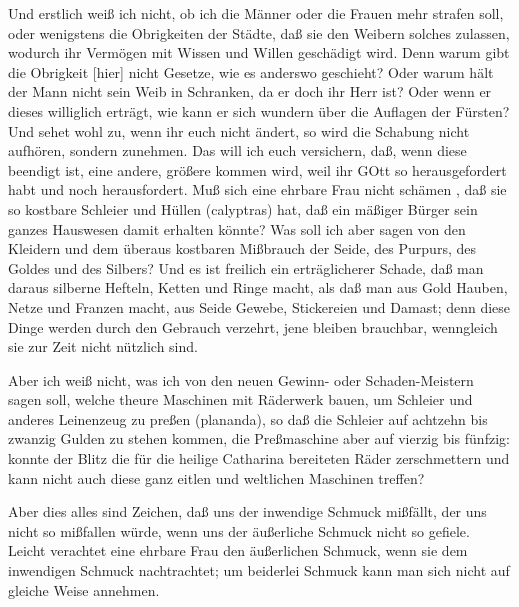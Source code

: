 Und erstlich weiß ich nicht, ob ich die Männer oder die Frauen mehr strafen soll, oder wenigstens die Obrigkeiten der Städte, daß sie den Weibern solches zulassen, wodurch ihr Vermögen mit Wissen und Willen geschädigt wird. Denn warum gibt die Obrigkeit [hier] nicht Gesetze, wie es anderswo geschieht? Oder warum hält der Mann nicht sein Weib in Schranken, da er doch ihr Herr ist? Oder wenn er dieses williglich erträgt, wie kann er sich wundern über die Auflagen der Fürsten? Und sehet wohl zu, wenn ihr euch nicht ändert, so wird die Schabung nicht aufhören, sondern zunehmen. Das will ich euch versichern, daß, wenn diese beendigt ist, eine andere, größere kommen wird, weil ihr GOtt so herausgefordert habt und noch herausfordert. Muß sich eine ehrbare Frau nicht schämen
, daß sie so kostbare Schleier und Hüllen (calyptras) hat, daß ein mäßiger Bürger sein ganzes Hauswesen damit erhalten könnte? Was soll ich aber sagen von den Kleidern und dem überaus kostbaren Mißbrauch der Seide, des Purpurs, des Goldes und des Silbers? Und es ist freilich ein erträglicherer Schade, daß man daraus silberne Hefteln, Ketten und Ringe macht, als daß man aus Gold Hauben, Netze und Franzen macht, aus Seide Gewebe, Stickereien und Damast; denn diese Dinge werden durch den Gebrauch verzehrt, jene bleiben brauchbar, wenngleich sie zur Zeit nicht nützlich sind.

Aber ich weiß nicht, was ich von den neuen Gewinn- oder Schaden-Meistern sagen soll, welche theure Maschinen mit Räderwerk bauen, um Schleier und anderes Leinenzeug zu preßen (plananda), so daß die Schleier auf achtzehn bis zwanzig Gulden zu stehen kommen, die Preßmaschine aber auf vierzig bis fünfzig: konnte der Blitz die für die heilige Catharina bereiteten Räder zerschmettern und kann nicht auch diese ganz eitlen und weltlichen Maschinen treffen?

Aber dies alles sind Zeichen, daß uns der inwendige Schmuck mißfällt, der uns nicht so mißfallen würde, wenn uns der äußerliche Schmuck nicht so gefiele. Leicht verachtet eine ehrbare Frau den äußerlichen Schmuck, wenn sie dem inwendigen Schmuck nachtrachtet; um beiderlei Schmuck kann man sich nicht auf gleiche Weise annehmen.

